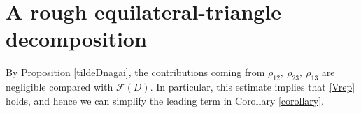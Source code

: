 \documentclass[reqno]{amsart}
\theoremstyle{plain}
\newtheorem{lemma}[theorem]{Lemma}
\theoremstyle{definition}
\numberwithin{equation}{section}
\newcommand{\1}{\mathbbm{1}}
\begin{document}
\section{A rough equilateral-triangle decomposition}
By Proposition \ref{tildeDnagai}, the contributions coming from $\rho_{12},\ \rho_{23},\ \rho_{13}$ are negligible compared with $\mathcal{F}(D)$.
In particular, this estimate implies that \eqref{Vrep} holds, and hence we can simplify the leading term in Corollary \ref{corollary}.
\end{document}
